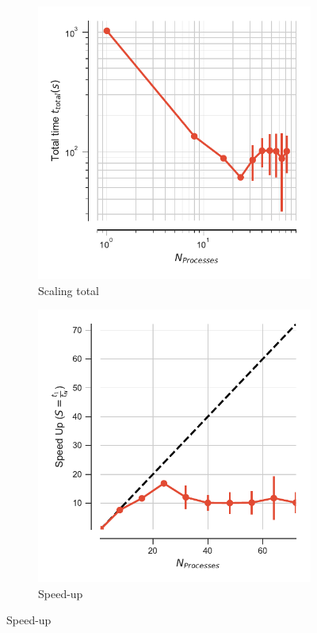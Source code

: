 \begin{figure}
\centering
\begin{subfigure}{.4\textwidth}
  \includegraphics[width=\linewidth]{figures/main-RMSD-t_total.pdf}
  \caption{Scaling total}
  \label{fig:MPIscaling}
\end{subfigure}
\hfill
\begin{subfigure}{.4\textwidth}
  \includegraphics[width=\linewidth]{figures/main-RMSD-speed_up.pdf}
  \caption{Speed-up}
  \label{fig:MPIspeedup}
\end{subfigure}
\bigskip


\end{figure}

